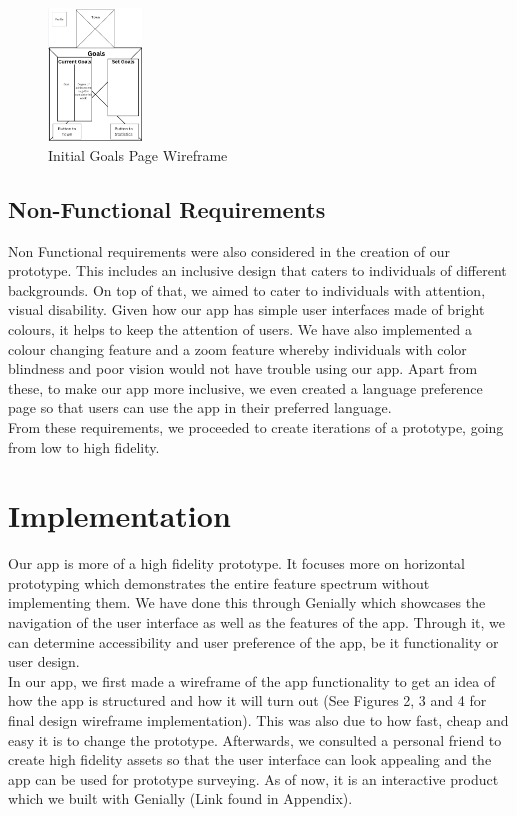\documentclass[sigconf, 11pt]{acmart}
\begin{document}
\begin{figure}[h]
\includegraphics[width=2.5cm]{images/First Goals Design.jpg}
\caption{Initial Goals Page Wireframe}
\end{figure}

\subsection{Non-Functional Requirements}
Non Functional requirements were also considered in the creation of our prototype. This includes an inclusive design that caters to individuals of different backgrounds. On top of that, we aimed to cater to individuals with attention, visual disability. Given how our app has simple user interfaces made of bright colours, it helps to keep the attention of users. We have also implemented a colour changing feature and a zoom feature whereby individuals with color blindness and poor vision would not have trouble using our app. Apart from these, to make our app more inclusive, we even created a language preference page so that users can use the app in their preferred language.
\\

From these requirements, we proceeded to create iterations of a prototype, going from low to high fidelity.


\section{Implementation}

Our app is more of a high fidelity prototype. It focuses more on horizontal prototyping which demonstrates the entire feature spectrum without implementing them. We have done this through Genially which showcases the navigation of the user interface as well as the features of the app. Through it, we can determine accessibility and user preference of the app, be it functionality or user design. 
\\

In our app, we first made a wireframe of the app functionality to get an idea of how the app is structured and how it will turn out (See Figures 2, 3 and 4 for final design wireframe implementation). This was also due to how fast, cheap and easy it is to change the prototype. Afterwards, we consulted a personal friend to create high fidelity assets so that the user interface can look appealing and the app can be used for prototype surveying.  As of now, it is an interactive product which we built with Genially (Link found in Appendix).  
\end{document}
